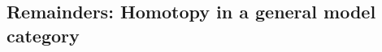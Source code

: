 \documentclass[a4paper,10pt
,draft
]{article}%
\numberwithin{equation}{section}
\numberwithin{figure}{section}
\theoremstyle{definition} %
\newtheorem{remark}[equation]{Remark}%
\newcommand{\V}{\ensuremath{\mathcal V}}
\newcommand{\1}{\ensuremath{\mathbbm 1}}%
\begin{document}











\subsection{Remainders: Homotopy in a general model category}
\end{document}

